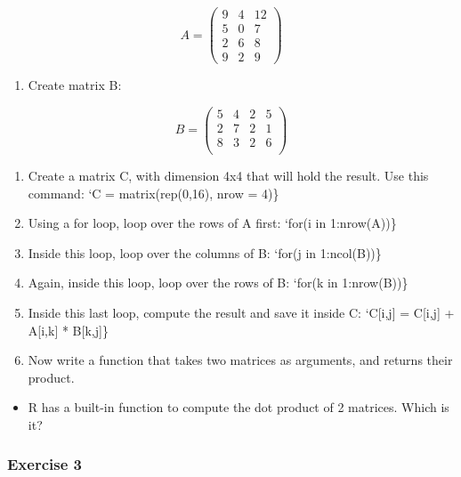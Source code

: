 \documentclass[
]{article}
\providecommand{\tightlist}{%
  \setlength{\itemsep}{0pt}\setlength{\parskip}{0pt}}
\begin{document}
\[A = \left(
  \begin{array}{ccc}
   9 & 4 & 12 \\
   5 & 0 & 7 \\
   2 & 6 & 8 \\
   9 & 2 & 9
  \end{array} \right)
\]

\begin{enumerate}
\def\labelenumi{\arabic{enumi})}
\setcounter{enumi}{1}
\tightlist
\item
  Create matrix B:
\end{enumerate}

\[B = \left(
\begin{array}{cccc}
 5 & 4 & 2 & 5 \\
 2 & 7 & 2 & 1 \\
 8 & 3 & 2 & 6 \\
\end{array} \right)
\]

\begin{enumerate}
\def\labelenumi{\arabic{enumi})}
\setcounter{enumi}{2}
\item
  Create a matrix C, with dimension 4x4 that will hold the result. Use this command: `C = matrix(rep(0,16), nrow = 4)\}
\item
  Using a for loop, loop over the rows of A first: `for(i in 1:nrow(A))\}
\item
  Inside this loop, loop over the columns of B: `for(j in 1:ncol(B))\}
\item
  Again, inside this loop, loop over the rows of B: `for(k in 1:nrow(B))\}
\item
  Inside this last loop, compute the result and save it inside C: `C{[}i,j{]} = C{[}i,j{]} + A{[}i,k{]} * B{[}k,j{]}\}
\item
  Now write a function that takes two matrices as arguments, and returns their product.
\end{enumerate}

\begin{itemize}
\tightlist
\item
  R has a built-in function to compute the dot product of 2 matrices. Which is it?
\end{itemize}

\hypertarget{exercise-3-3}{%
\subsubsection*{Exercise 3}\label{exercise-3-3}}
\end{document}
